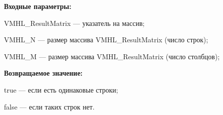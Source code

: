 \textbf{Входные параметры:}
 
VMHL\_ResultMatrix --- указатель на массив;
 
VMHL\_N --- размер массива VMHL\_ResultMatrix (число строк);
 
VMHL\_M --- размер массива VMHL\_ResultMatrix (число столбцов);

\textbf{Возвращаемое значение:}

 true --- если есть одинаковые строки;
 
 false --- если таких строк нет.